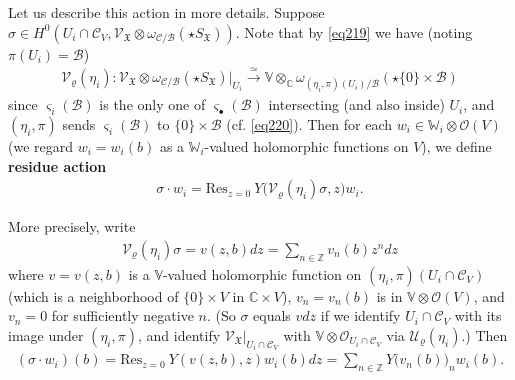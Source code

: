 \documentclass[11pt,b5paper,notitlepage]{article}
\theoremstyle{definition}
\theoremstyle{plain}
\newcommand{\fk}{\mathfrak}
\newcommand{\mc}{\mathcal}
\newcommand{\Res}{\mathrm{Res}}
\newcommand{\scr}{\mathscr}
\newcommand{\sgm}{\varsigma}
\newcommand{\SX}{{S_{\fk X}}}
\newcommand{\blt}{\bullet}
\newcommand{\Vbb}{\mathbb V}
\newcommand{\Wbb}{\mathbb W}
\newcommand{\Cbb}{\mathbb C}
\newcommand{\Zbb}{\mathbb Z}
\numberwithin{equation}{section}
\begin{document}
Let us describe this action in more details. Suppose $\sigma\in H^0(U_i\cap\mc C_V,\scr V_{\fk X}\otimes\omega_{\mc C/\mc B}(\star\SX))$. Note that by \eqref{eq219} we have (noting $\pi(U_i)=\mc B$)
\begin{align}
\mc V_\varrho(\eta_i):\scr V_{\fk X}\otimes\omega_{\mc C/\mc B}(\star\SX)\big|_{U_i}\xrightarrow{\simeq} \Vbb\otimes_\Cbb\omega_{(\eta_i,\pi)(U_i)/\mc B}(\star \{0\}\times\mc B)
\end{align}
since $\sgm_i(\mc B)$ is the only one of $\sgm_\blt(\mc B)$ intersecting (and also inside) $U_i$, and $(\eta_i,\pi)$ sends $\sgm_i(\mc B)$ to $\{0\}\times\mc B$ (cf. \eqref{eq220}). Then for each $w_i\in\Wbb_i\otimes\scr O(V)$ (we regard $w_i=w_i(b)$ as a $\Wbb_i$-valued holomorphic functions on $V$), we define \textbf{residue action}
\begin{align}
\sigma\cdot w_i=\Res_{z=0}~Y\big(\mc V_\varrho(\eta_i)\sigma,z \big)w_i.\label{eq226}
\end{align}

More precisely, write
\begin{align}
\mc V_\varrho(\eta_i)\sigma=v(z,b)dz=\sum_{n\in\Zbb}v_n(b)z^ndz
\end{align}
where $v=v(z,b)$ is a $\Vbb$-valued holomorphic function on $(\eta_i,\pi)(U_i\cap \mc C_V)$ (which is a neighborhood of $\{0\}\times V$ in $\Cbb\times V$), $v_n=v_n(b)$ is in $\Vbb\otimes\scr O(V)$, and $v_n=0$ for sufficiently negative $n$. (So $\sigma$ equals $vdz$ if we identify $U_i\cap\mc C_V$ with its image under $(\eta_i,\pi)$, and identify $\scr V_{\fk X}|_{U_i\cap\mc C_V}$ with $\Vbb\otimes\scr O_{U_i\cap\mc C_V}$ via $\mc U_\varrho(\eta_i)$.) Then
\begin{align}
(\sigma\cdot w_i)(b)=\Res_{z=0}~Y(v(z,b),z)w_i(b)dz=\sum_{n\in\Zbb} Y\big(v_n(b)\big)_nw_i(b).
\end{align}
\end{document}
